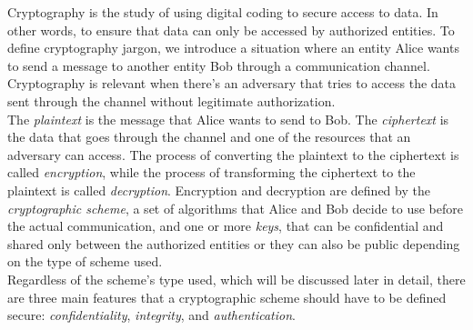 Cryptography is the study of using digital coding to secure access to data. In other words, to ensure that data can only be accessed by authorized entities. To define cryptography jargon, we introduce a situation where an entity Alice wants to send a message to another entity Bob through a communication channel. Cryptography is relevant when there's an adversary that tries to access the data sent through the channel without legitimate authorization.\\
The \emph{plaintext} is the message that Alice wants to send to Bob. The \emph{ciphertext} is the data that goes through the channel and one of the resources that an adversary can access.
The process of converting the plaintext to the ciphertext is called \emph{encryption}, while the process of transforming the ciphertext to the plaintext is called \emph{decryption}.
Encryption and decryption are defined by the \emph{cryptographic scheme}, a set of algorithms that Alice and Bob decide to use before the actual communication, and one or more \emph{keys}, that can be confidential and shared only between the authorized entities or they can also be public depending on the type of scheme used.\\
Regardless of the scheme's type used, which will be discussed later in detail, there are three main features that a cryptographic scheme should have to be defined secure: \emph{confidentiality}, \emph{integrity}, and \emph{authentication}.
